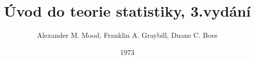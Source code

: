 \documentclass[a4paper]{book}
\begin{document}
\newtheorem{definition}{Definice}[chapter]
\newtheorem{theorem}{Věta}[chapter]
\newtheorem{proof}{Důkaz}[chapter]
\newtheorem{example}{Příklad}[chapter]
\newtheorem{corollary}{Tvrzení}[chapter]


\title{Úvod do teorie statistiky, 3.vydání}
\author{Alexander M. Mood, Franklin A. Graybill, Duane C. Boes}
\date{1973}
\maketitle

\tableofcontents













\end{document}
